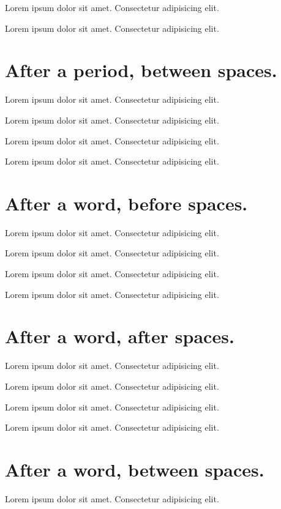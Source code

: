 \documentclass[12pt]{article}
\begin{document}
Lorem ipsum dolor sit amet.  Consectetur adipisicing elit.

Lorem ipsum dolor sit amet.   Consectetur adipisicing elit.

\section*{After a period, between spaces.}

Lorem ipsum dolor sit amet.  Consectetur adipisicing elit.

Lorem ipsum dolor sit amet.    Consectetur adipisicing elit.

Lorem ipsum dolor sit amet.    Consectetur adipisicing elit.

Lorem ipsum dolor sit amet.     Consectetur adipisicing elit.

\section*{After a word, before spaces.}

Lorem ipsum dolor sit amet.  Consectetur adipisicing elit.

Lorem ipsum dolor sit amet.  Consectetur adipisicing elit.

Lorem ipsum dolor sit amet.  Consectetur adipisicing elit.

Lorem ipsum dolor  sit amet.  Consectetur adipisicing elit.

\section*{After a word, after spaces.}

Lorem ipsum dolor sit amet.  Consectetur adipisicing elit.

Lorem ipsum dolor sit amet.  Consectetur adipisicing elit.

Lorem ipsum dolor sit amet.  Consectetur adipisicing elit.

Lorem ipsum dolor  sit amet.  Consectetur adipisicing elit.

\section*{After a word, between spaces.}

Lorem ipsum dolor sit amet.  Consectetur adipisicing elit.
\end{document}
